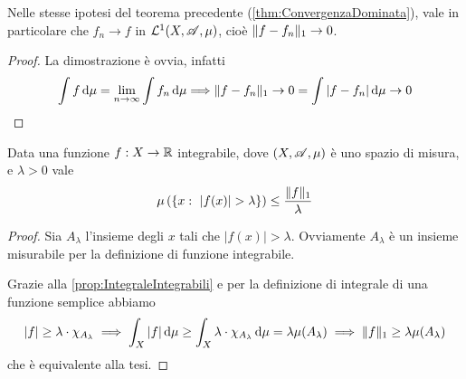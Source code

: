 \begin{corollary}\label{cor:ConvergenzaL1Dominata}
	Nelle stesse ipotesi del teorema precedente (\cref{thm:ConvergenzaDominata}), vale in particolare che $f_n\to f$ in $\mathcal L^1(X,\mathscr A,\mu)$, cioè $\Vert f-f_n\Vert_1\to 0$.
\end{corollary}
\begin{proof}
	La dimostrazione è ovvia, infatti 
	\begin{equation*}
		\int f \,\mathrm d\mu=\lim_{n\to\infty}\int f_n\,\mathrm d\mu \Longrightarrow \Vert f-f_n\Vert_1\to 0=\int |f-f_n|\,\mathrm d\mu\to 0
	\end{equation*}

\end{proof}



\begin{theorem}\label{thm:DisuguaglianzaChebyshev}
	Data una funzione $f:X\to\mathbb R$ integrabile, dove $(X,\mathscr A,\mu)$ è uno spazio di misura, e $\lambda>0$ vale
	\begin{equation*}
		\mu\left(\left\{x:\ |f(x)|>\lambda\right\}\right) \le \frac{\LNorm f}{\lambda}
	\end{equation*}
\end{theorem}
\begin{proof}
	Sia $A_\lambda$ l'insieme degli $x$ tali che $|f(x)|>\lambda$. Ovviamente $A_\lambda$ è un insieme misurabile per la definizione di funzione integrabile.
	
	Grazie alla \cref{prop:IntegraleIntegrabili} e per la definizione di integrale di una funzione semplice abbiamo
	\begin{equation*}
		|f|\ge\lambda \cdot \chi_{A_\lambda} \implies \int_X |f|\,\mathrm d\mu \ge \int_X \lambda\cdot\chi_{A_\lambda}\,\mathrm d\mu=\lambda\mu(A_\lambda)\implies
		\Vert f\Vert_1\ge \lambda\mu(A_\lambda)
	\end{equation*}
	che è equivalente alla tesi.
\end{proof}

